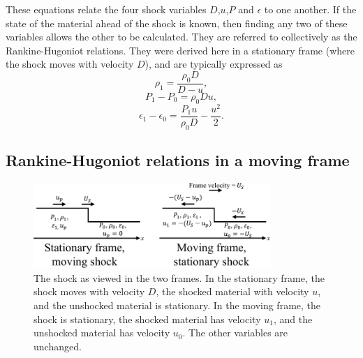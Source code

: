 These equations relate the four shock variables $D$,$u$,$P$ and $\epsilon$ to one another. If the state of the material ahead of the shock is known, then finding any two of these variables allows the other to be calculated. They are referred to collectively as the Rankine-Hugoniot relations. They were derived here in a stationary frame (where the shock moves with velocity $D$), and are typically expressed as
\begin{equation} \rho_1 = \frac{\rho_0 D}{D - u}, \label{eqn: RH1 stationary} \end{equation}
\begin{equation} P_1 - P_0 = \rho_0 D u, \label{eqn: RH2 stationary} \end{equation}
\begin{equation} \epsilon_1 - \epsilon_0 = \frac{P_1 u}{\rho_0 D} - \frac{u^2}{2}. \label{eqn: RH3 stationary} \end{equation}

\subsection{Rankine-Hugoniot relations in a moving frame}

\begin{figure}
\centering
\includegraphics[width=0.8\textwidth]{figures/Theory/ReferenceFrames.pdf}%
\caption{\label{fig:ReferenceFrames} The shock as viewed in the two frames. In the stationary frame, the shock moves with velocity $D$, the shocked material with velocity $u$, and the unshocked material is stationary. In the moving frame, the shock is stationary, the shocked material has velocity $u_1$, and the unshocked material has velocity $u_0$. The other variables are unchanged.}
\end{figure}

